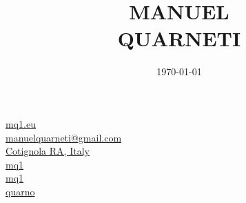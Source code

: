 \documentclass{article}
\title{\vspace{-40pt} \HUGE \bfseries MANUEL \\[-20pt] QUARNETI \vspace{-40pt}}
\author{}
\date{\today}
\begin{document}
\begin{paracol}{3}

    \switchcolumn

    \maketitle

    \switchcolumn

    \begin{flushright}
        \href{https://mq1.eu/}{mq1.eu} \ \faGlobe \\
        \href{mailto:manuelquarneti@gmail.com}{manuelquarneti@gmail.com} \ \faEnvelope \\
        \href{https://www.openstreetmap.org/relation/43112}{Cotignola RA, Italy} \ \faCity \\
        \href{https://github.com/mq1}{mq1} \ \faGithub \\
        \href{https://www.linkedin.com/in/mq1}{mq1} \ \faLinkedin \\
        \href{https://t.me/quarno}{quarno} \ \faTelegram
    \end{flushright}
\end{paracol}
\end{document}
